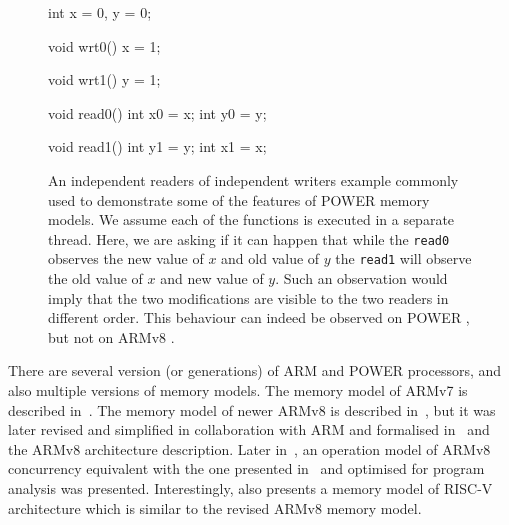 \begin{figure}[tp]
    \begin{cppcode}
        int x = 0, y = 0;
    \end{cppcode}
    \begin{multicols}{4}
        \begin{cppcode}
          void wrt0()
          {
            x = 1;
          }
        \end{cppcode}
        \columnbreak
        \begin{cppcode}
          void wrt1()
          {
            y = 1;
          }
        \end{cppcode}
        \columnbreak
        \begin{cppcode}
          void read0()
          {
            int x0 = x;
            int y0 = y;
          }
        \end{cppcode}
        \columnbreak
        \begin{cppcode}
          void read1()
          {
            int y1 = y;
            int x1 = x;
          }
        \end{cppcode}
    \end{multicols}
    \vspace{-4.5ex}
    \caption{
        An independent readers of independent writers example commonly used to
        demonstrate some of the features of POWER memory models.
        We assume each of the functions is executed in a separate thread.
        Here, we are asking if it can happen that while the \texttt{read0}
        observes the new value of $x$ and old value of $y$ the \texttt{read1}
        will observe the old value of $x$ and new value of $y$.
        Such an observation would imply that the two modifications are visible
        to the two readers in different order.
        This behaviour can indeed be observed on POWER \cite{Sarkar2011}, but
        not on ARMv8 \cite{Pulte2017}.
    }\label{fig:prelim:iriw}
\end{figure}

There are several version (or generations) of ARM and POWER processors, and
also multiple versions of memory models.
The memory model of ARMv7 is described in~.
The memory model of newer ARMv8 is described in~, but it was
later revised and simplified in collaboration with ARM and formalised
in~ and the ARMv8 architecture description.
Later in~, an operation model of ARMv8 concurrency equivalent
with the one presented in~ and optimised for program analysis
was presented.
Interestingly,  also presents a memory model of RISC-V
architecture which is similar to the revised ARMv8 memory model.

